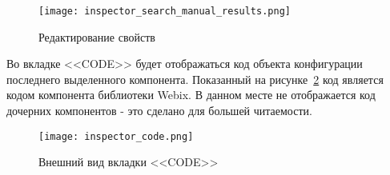 \begin{figure}[ht]
  \centering
    \texttt{[image: inspector\_search\_manual\_results.png]}
    \caption{Редактирование свойств}
    \label{sec:manual:inspector_search_manual_results}
\end{figure}

Во вкладке <<CODE>> будет отображаться код объекта конфигурации последнего выделенного компонента. Показанный на рисунке~\ref{sec:manual:inspector_code} код является кодом компонента библиотеки Webix. В данном месте не отображается код дочерних компонентов - это сделано для большей читаемости.
\pagebreak

\begin{figure}[ht]
  \centering
    \texttt{[image: inspector\_code.png]}
    \caption{Внешний вид вкладки <<CODE>>}
    \label{sec:manual:inspector_code}
\end{figure}